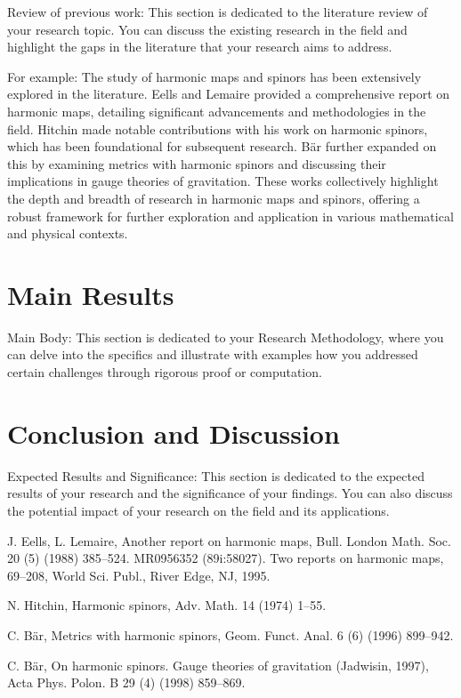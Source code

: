 \documentclass[12pt]{article}
\begin{document}
Review of previous work: This section is dedicated to the literature review of your research topic. You can discuss the existing research in the field and highlight the gaps in the literature that your research aims to address.

For example:
The study of harmonic maps and spinors has been extensively explored in the literature. Eells and Lemaire \cite{eells1988} provided a comprehensive report on harmonic maps, detailing significant advancements and methodologies in the field. Hitchin \cite{hitchin1974} made notable contributions with his work on harmonic spinors, which has been foundational for subsequent research. Bär \cite{bar1996, bar1998} further expanded on this by examining metrics with harmonic spinors and discussing their implications in gauge theories of gravitation. These works collectively highlight the depth and breadth of research in harmonic maps and spinors, offering a robust framework for further exploration and application in various mathematical and physical contexts.

\section{Main Results}

Main Body: This section is dedicated to your Research Methodology, where you can delve into the specifics and illustrate with examples how you addressed certain challenges through rigorous proof or computation.

\section{Conclusion and Discussion}

Expected Results and Significance: This section is dedicated to the expected results of your research and the significance of your findings. You can also discuss the potential impact of your research on the field and its applications.

\begin{thebibliography}{9}

J. Eells, L. Lemaire, Another report on harmonic maps, Bull. London Math. Soc. 20 (5) (1988) 385–524. MR0956352 (89i:58027). Two reports on harmonic maps, 69–208, World Sci. Publ., River Edge, NJ, 1995.

N. Hitchin, Harmonic spinors, Adv. Math. 14 (1974) 1–55.

C. Bär, Metrics with harmonic spinors, Geom. Funct. Anal. 6 (6) (1996) 899–942.

C. Bär, On harmonic spinors. Gauge theories of gravitation (Jadwisin, 1997), Acta Phys. Polon. B 29 (4) (1998) 859–869.

\end{thebibliography}
\end{document}
